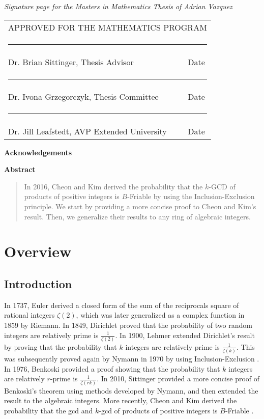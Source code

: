 \documentclass[12pt]{amsart}
\def\name{Adrian Vazquez}
\newcommand{\thesisadvisor}{Dr. Brian Sittinger}
\newcommand{\firstfaculty}{Dr. Ivona Grzegorczyk}
\newcommand{\univefaculty}{Dr. Jill Leafstedt}
\newcommand{\committee}{\vspace*{1.25in} 
\begin{tabular}{ll}
   \multicolumn{2}{c}{\hspace*{2.9cm} APPROVED FOR THE MATHEMATICS PROGRAM}\\[10mm]
   \multicolumn{2}{c}{\hspace*{1.65cm}\rule{4.5in}{.01in}}\\[-4mm]
   \hspace*{3cm}\thesisadvisor, Thesis Advisor \hspace*{0cm}&  Date\\[4mm]
   \multicolumn{2}{c}{\hspace*{1.65cm}\rule{4.5in}{.01in}}\\[-4mm]
   \hspace*{3cm}\firstfaculty, Thesis Committee \hspace*{0cm}&  Date\\[4mm]
   \multicolumn{2}{c}{\hspace*{1.65cm}\rule{4.5in}{.01in}}\\[-4mm]
    \hspace*{3cm}\univefaculty, AVP Extended University \hspace*{0cm}&  Date\\
 \end{tabular}}
\theoremstyle{definition}
\begin{document}
\newpage
 \setlength{\paperheight}{13in}
 \setlength{\topmargin}{1.25cm}

{\center\emph{Signature page for the Masters in Mathematics Thesis of \name}}

\committee


 \newpage
 \setlength{\topmargin}{-0.4375in}
 \setlength{\paperheight}{11.5in}

\newpage

\begin{center}
\vspace*{50mm}
{\bf Acknowledgements}
\end{center}

\newpage

\pagestyle{plain}

{\bf Abstract}
\bigskip
\begin{quote}
In 2016, Cheon and Kim derived the probability that the $k$-GCD of products of positive integers is $B$-Friable by using the Inclusion-Exclusion principle. We start by providing a more concise proof to Cheon and Kim's result. Then, we generalize their results to any ring of algebraic integers.
\end{quote}



\newpage
\tableofcontents
\newpage
\newpage
{}

\section{Overview}

\subsection{Introduction}

In 1737, Euler derived a closed form of the sum of the reciprocals square of rational integers $\zeta(2)$, which was later generalized as a complex function in 1859 by Riemann. In 1849, Dirichlet \cite{Dirichlet} proved that the probability of two random integers are relatively prime is $\frac{1}{\zeta(2)}$. In 1900, Lehmer \cite{Lehmer} extended Dirichlet's result by proving that the probability that $k$ integers are relatively prime is $\frac{1}{\zeta(k)}$. This was subsequently proved again by Nymann in 1970 by using Inclusion-Exclusion \cite{Nymann}. In 1976, Benkoski \cite{Benkoski} provided a proof showing that the probability that $k$ integers are relatively $r$-prime is $\frac{1}{\zeta(rk)}$. In 2010, Sittinger \cite{Sittinger} provided a more concise proof of Benkoski's theorem using methods developed by Nymann, and then extended the result to the algebraic integers. More recently, Cheon and Kim derived the probability that the gcd and $k$-gcd of products of positive integers is $B$-Friable \cite{Cheon}.
\end{document}
